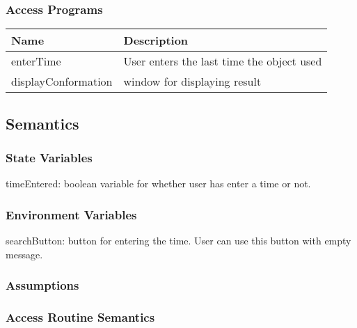 \documentclass[12pt, titlepage]{article}
\begin{document}
\subsubsection{Access Programs}


\begin{center}
\begin{tabular}{p{4cm} p{8cm} }
\hline
\textbf{Name} & \textbf{Description}  \\
\hline
enterTime & User enters the last time the object used \\
\hline
displayConformation & window for displaying result\\
\hline

\end{tabular}
\end{center}

\subsection{Semantics}

\subsubsection{State Variables}

timeEntered: boolean variable for whether user has enter a time or not.

\subsubsection{Environment Variables}

searchButton: button for entering the time. User can use this button with empty message.

\subsubsection{Assumptions}


\subsubsection{Access Routine Semantics}
\end{document}

